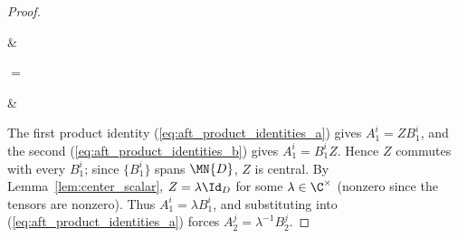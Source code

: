 \begin{proof}
\begin{center}
        \begin{tenkz}[cols=2, west=open, east=open]
             & 
        \end{tenkz}
        $ = $
        \begin{tenkz}[cols=2, west=open, east=open]
             & 
        \end{tenkz}
    \end{center}
    The first product identity (\ref{eq:aft_product_identities_a}) gives
    $A_1^i=ZB_1^i$, and the second
    (\ref{eq:aft_product_identities_b}) gives $A_1^i=B_1^iZ$.
    Hence $Z$ commutes with every $B_1^i$; since $\{B_1^i\}$ spans
    $\MN{D}$, $Z$ is central.
    By Lemma~\ref{lem:center_scalar}, $Z=\lambda\Id_D$ for some
    $\lambda\in\C^{\times}$ (nonzero since the tensors are nonzero).
    Thus $A_1^i=\lambda B_1^i$, and substituting
    into (\ref{eq:aft_product_identities_a}) forces
    $A_2^j=\lambda^{-1}B_2^j$.
\end{proof}

